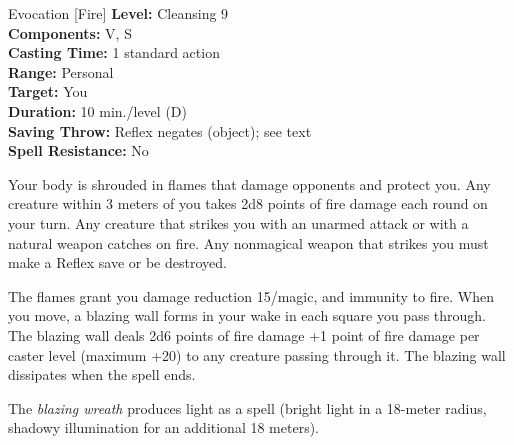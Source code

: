 {Evocation [Fire]}
{
	\textbf{Level:}
	Cleansing 9 \\
	\textbf{Components:}
	V, S \\
	\textbf{Casting Time:}
	1 standard action \\
	\textbf{Range:}
	Personal \\
	\textbf{Target:}
	You \\
	\textbf{Duration:}
	10 min./level (D) \\
	\textbf{Saving Throw:}
	Reflex negates (object); see text \\
	\textbf{Spell Resistance:}
	No \\
}
{
	Your body is shrouded in flames that damage opponents and protect you. Any creature within 3 meters of you takes 2d8 points of fire damage each round on your turn. Any creature that strikes you with an unarmed attack or with a natural weapon catches on fire. Any nonmagical weapon that strikes you must make a Reflex save or be destroyed.

	The flames grant you damage reduction 15/magic, and immunity to fire. When you move, a blazing wall forms in your wake in each square you pass through. The blazing wall deals 2d6 points of fire damage +1 point of fire damage per caster level (maximum +20) to any creature passing through it. The blazing wall dissipates when the spell ends.

	The \emph{blazing wreath} produces light as a  spell (bright light in a 18-meter radius, shadowy illumination for an additional 18 meters).
}
